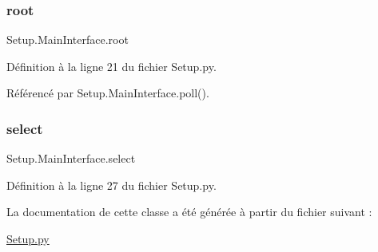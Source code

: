 \subsubsection{\texorpdfstring{root}{root}}
{\footnotesize\ttfamily Setup.\+Main\+Interface.\+root}



Définition à la ligne 21 du fichier Setup.\+py.



Référencé par Setup.\+Main\+Interface.\+poll().

\mbox{\label{classSetup_1_1MainInterface_a55aec7e8acf1047b96ff647558736e35}} 
\subsubsection{\texorpdfstring{select}{select}}
{\footnotesize\ttfamily Setup.\+Main\+Interface.\+select}



Définition à la ligne 27 du fichier Setup.\+py.



La documentation de cette classe a été générée à partir du fichier suivant \+:\begin{DoxyCompactItemize}
\item 
\hyperlink{Setup_8py}{Setup.\+py}\end{DoxyCompactItemize}
